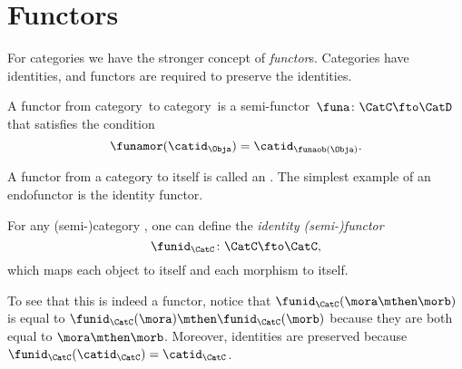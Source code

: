 \section{Functors}

For categories we have the stronger concept of \emph{functor}s.
Categories have identities, and functors are required to preserve the identities.

\begin{ctdefinition}
	\label{def:functor}
	A functor from category~\CatC to category~\CatD is a semi-functor~$\funa\colon \CatC \fto \CatD$
	that satisfies the condition
	\begin{equation}
		\label{eq:functor-condition}
		\funamor(\catid_\Obja)=\catid_{\funaob(\Obja)}.
	\end{equation}
\end{ctdefinition}


A functor from a category to itself is called an \emph{}.
The simplest example of an endofunctor is the identity functor.

\begin{definition}
	For any (semi-)category \CatC, one can define the \emph{identity (semi-)functor}
	\begin{equation}
		\funid_\CatC \colon \CatC \fto \CatC,
	\end{equation}
	which maps each object to itself and each morphism to itself.
\end{definition}

To see that this is indeed a functor, notice that $\funid_\CatC(\mora \mthen \morb)$ is equal to
$\funid_\CatC(\mora)\mthen \funid_\CatC(\morb)$ because they are both equal to $\mora \mthen \morb$.
Moreover, identities are preserved because~$\funid_\CatC(\catid_\CatC)=\catid_\CatC$.

